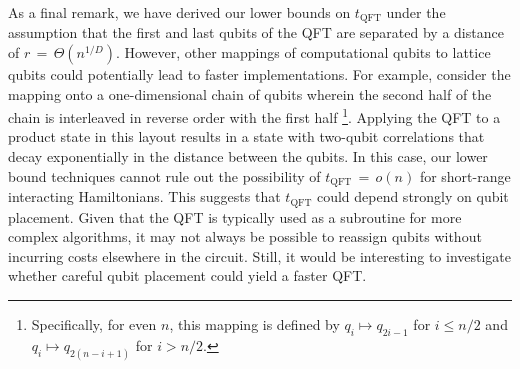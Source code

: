 As a final remark, we have derived our lower bounds on $t_\textrm{QFT}$ under the assumption that the first and last qubits of the QFT are separated by a distance of $r$\,$=$\,$\Theta(n^{1/D})$.
However, other mappings of computational qubits to lattice qubits could potentially lead to faster implementations.
For example, consider the mapping onto a one-dimensional chain of qubits wherein the second half of the chain is interleaved in reverse order with the first half \footnote{Specifically, for even $n$, this mapping is defined by $q_i\mapsto q_{2i-1}$ for $i \le n/2$ and $q_i\mapsto q_{2(n-i+1)}$ for $i > n/2$.}.
Applying the QFT to a product state in this layout results in a state with two-qubit correlations that decay exponentially in the distance between the qubits.
In this case, our lower bound techniques cannot rule out the possibility of $t_\textrm{QFT}$\,$=$\,$o(n)$ for short-range interacting Hamiltonians.
This suggests that $t_\textrm{QFT}$ could depend strongly on qubit placement.
Given that the QFT is typically used as a subroutine for more complex algorithms, it may not always be possible to reassign qubits without incurring costs elsewhere in the circuit.
Still, it would be interesting to investigate whether careful qubit placement could yield a faster QFT.
